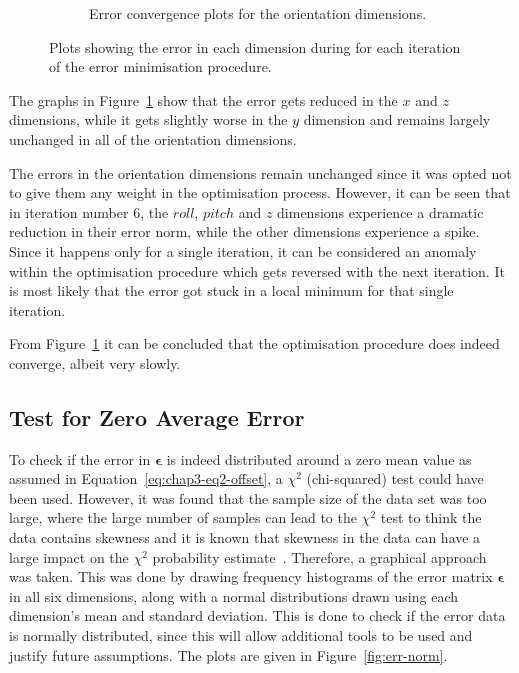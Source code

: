 \begin{figure}
\begin{subfigure}{0.48\textwidth}
\begin{subfigure}{\textwidth}
    \end{subfigure}
    \caption{Error convergence plots for the orientation dimensions.}
  \end{subfigure}
  \caption[Plots showing error convergence for the optimsation procedure.]{Plots showing the error in each dimension during for each iteration of the error minimisation procedure.}
  \label{fig:err-convergence}
\end{figure}

The graphs in Figure~\ref{fig:err-convergence} show that the error gets reduced in the $x$ and $z$ dimensions, while it gets slightly worse in the $y$ dimension and remains largely unchanged in all of the orientation dimensions. 

The errors in the orientation dimensions remain unchanged since it was opted not to give them any weight in the optimisation process. However, it can be seen that in iteration number 6, the $roll$, $pitch$ and $z$ dimensions experience a dramatic reduction in their error norm, while the other dimensions experience a spike. Since it happens only for a single iteration, it can be considered an anomaly within the optimisation procedure which gets reversed with the next iteration. It is most likely that the error got stuck in a local minimum for that single iteration.  

From Figure~\ref{fig:err-convergence} it can be concluded that the optimisation procedure does indeed converge, albeit very slowly. 

\subsection{Test for Zero Average Error}
\label{sec:err-norm-test}

To check if the error in $\bm{\epsilon}$ is indeed distributed around a zero mean value as assumed in Equation~\ref{eq:chap3-eq2-offset}, a $\chi^2$ (chi-squared) test could have been used. However, it was found that the sample size of the data set was too large, where the large number of samples can lead to the $\chi^2$ test to think the data contains skewness and it is known that skewness in the data can have a large impact on the $\chi^2$ probability estimate~\citep{wackerly2007mathematical}. Therefore, a graphical approach was taken. This was done by drawing frequency histograms of the error matrix $\bm{\epsilon}$ in all six dimensions, along with a normal distributions drawn using each dimension's mean and standard deviation. This is done to check if the error data is normally distributed, since this will allow additional tools to be used and justify future assumptions. The plots are given in Figure~\ref{fig:err-norm}.

